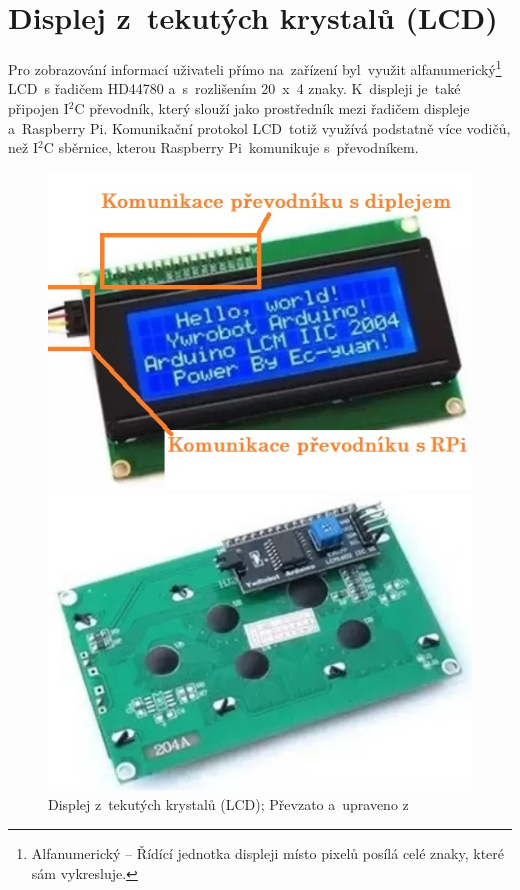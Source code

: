 \section{Displej z~tekutých krystalů (LCD)}
Pro zobrazování informací uživateli přímo na~zařízení byl~využit alfanumerický\footnote{Alfanumerický -- Řídící jednotka displeji místo pixelů posílá celé znaky, které sám vykresluje.} LCD~s řadičem HD44780 a~s~rozlišením 20~x~4 znaky. K~displeji je~také připojen I$^{2}$C převodník, který slouží jako prostředník mezi řadičem displeje a~Raspberry Pi.
Komunikační protokol LCD~totiž využívá podstatně více vodičů, než I$^{2}$C sběrnice, kterou Raspberry Pi~komunikuje s~převodníkem.

\begin{figure}[htb]
  \centering
  \begin{minipage}{0.45\textwidth}
    \centering
    \includegraphics[width=1\textwidth]{img/LCD_front.jpg} %
    \caption{\label{fig:LCD_front} Displej z~tekutých krystalů (LCD); Převzato a~upraveno z~\cite{laskakit-LCD}}
  \end{minipage}\hfill
  \begin{minipage}{0.45\textwidth}
    \centering
    \includegraphics[width=1\textwidth]{img/LCD_back.jpg} %

\end{minipage}
\end{figure}
